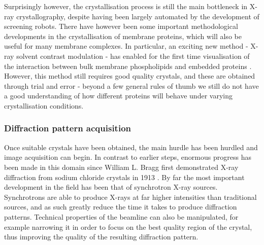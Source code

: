 \documentclass[a4paper,11pt,twoside,openright]{scrbook}
\begin{document}
Surprisingly however, the crystallisation process is still the main bottleneck in X-ray crystallography, despite having been largely automated by the development of screening robots. There have however been some important methodological developments in the crystallisation of membrane proteins, which will also be useful for many membrane complexes. In particular, an exciting new method - X-ray solvent contrast modulation - has enabled for the first time visualisation of the interaction between bulk membrane phospholipids and embedded proteins \cite{Norimatsu2017}. However, this method still requires good quality crystals, and these are obtained through trial and error - beyond a few general rules of thumb we still do not have a good understanding of how different proteins will behave under varying crystallisation conditions.


\subsubsection{Diffraction pattern acquisition}
Once suitable crystals have been obtained, the main hurdle has been hurdled and image acquisition can begin. In contrast to earlier steps, enormous progress has been made in this domain since William L. Bragg first demonstrated X-ray diffraction from sodium chloride crystals in 1913 \cite{Bragg1913}. By far the most important development in the field has been that of synchrotron X-ray sources. Synchrotrons are able to produce X-rays at far higher intensities than traditional sources, and as such greatly reduce the time it takes to produce diffraction patterns. Technical properties of the beamline can also be manipulated, for example narrowing it in order to focus on the best quality region of the crystal, thus improving the quality of the resulting diffraction pattern.
\end{document}
